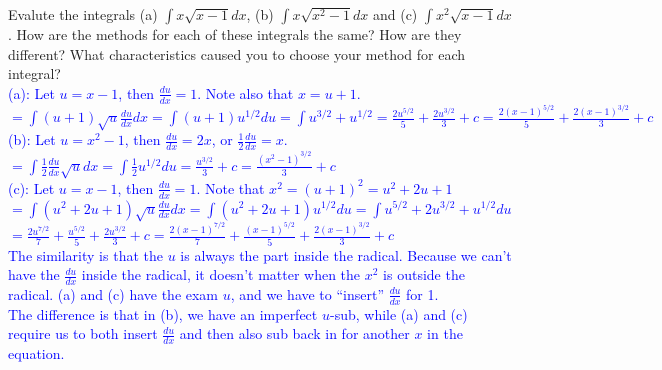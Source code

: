 \documentclass{ximera}
\begin{document}
\begin{exercise}
    Evalute the integrals (a) $\int x\sqrt{x-1}dx$, (b) $\int x\sqrt{x^2-1}dx$ and (c) $\int x^2\sqrt{x-1}dx$.  How are the methods for each of these integrals the same?  How are they different?  What characteristics caused you to choose your method for each integral?\\
    \textcolor{blue}{(a): Let $u=x-1$, then $\frac{du}{dx}=1$.  Note also that $x=u+1$.\\
    $=\int (u+1)\sqrt{u}\frac{du}{dx}dx=\int (u+1)u^{1/2}du=\int u^{3/2}+u^{1/2}=\frac{2u^{5/2}}{5}+\frac{2u^{3/2}}{3}+c=\frac{2(x-1)^{5/2}}{5}+\frac{2(x-1)^{3/2}}{3}+c$\\
    (b): Let $u=x^2-1$, then $\frac{du}{dx}=2x$, or $\frac{1}{2}\frac{du}{dx}=x$.\\
    $=\int \frac{1}{2}\frac{du}{dx}\sqrt{u}dx=\int \frac{1}{2}u^{1/2}du=\frac{u^{3/2}}{3}+c=\frac{(x^2-1)^{3/2}}{3}+c$\\
    (c): Let $u=x-1$, then $\frac{du}{dx}=1$.  Note that $x^2=(u+1)^2=u^2+2u+1$\\
    $=\int (u^2+2u+1)\sqrt{u}\frac{du}{dx}dx=\int (u^2+2u+1)u^{1/2}du=\int u^{5/2}+2u^{3/2}+u^{1/2}du$\\
    $=\frac{2u^{7/2}}{7}+\frac{u^{5/2}}{5}+\frac{2u^{3/2}}{3}+c=\frac{2(x-1)^{7/2}}{7}+\frac{(x-1)^{5/2}}{5}+\frac{2(x-1)^{3/2}}{3}+c$\\
    The similarity is that the $u$ is always the part inside the radical.  Because we can't have the $\frac{du}{dx}$ inside the radical, it doesn't matter when the $x^2$ is outside the radical.  (a) and (c) have the exam $u$, and we have to ``insert'' $\frac{du}{dx}$ for 1. \\
    The difference is that in (b), we have an imperfect $u$-sub, while (a) and (c) require us to both insert $\frac{du}{dx}$ and then also sub back in for another $x$ in the equation.  }
\end{exercise}
\end{document}

